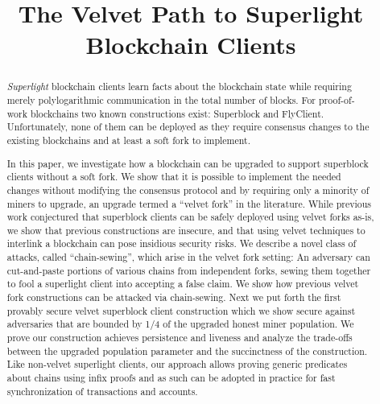\documentclass[sigconf, anonymous]{acmart}
\theoremstyle{plain}
\theoremstyle{definition}
\begin{document}
\title{%
The Velvet Path to Superlight Blockchain Clients
} %

\begin{abstract}
{\em Superlight} blockchain clients
learn facts about the blockchain state
while requiring merely polylogarithmic communication in the total 
number of blocks. 
%
For proof-of-work blockchains %
two known constructions exist: Superblock and FlyClient. 
%
Unfortunately, none of them can be deployed as they require consensus changes to the existing blockchains and at least a soft fork to implement.

In this paper, we %
investigate how a blockchain can be upgraded to support superblock clients without a soft fork. We show that it is possible to implement the needed changes without modifying the consensus protocol and by requiring only a minority of miners to upgrade, an upgrade termed a ``velvet fork'' in the literature. While previous work conjectured that superblock clients can be safely deployed using velvet forks as-is, we show that previous constructions are insecure, and that using velvet techniques to interlink a blockchain can pose insidious security risks. We describe a novel class of attacks, called  ``chain-sewing'', which arise in the velvet fork setting: An adversary can cut-and-paste portions of various chains from independent forks, sewing them together to 
fool a superlight client into accepting a false claim.
We show how previous velvet fork constructions can be attacked via chain-sewing. 
%
Next we put forth the first provably secure velvet superblock client construction which we show  secure against adversaries that are bounded by 1/4 of the upgraded honest miner population. We prove our construction achieves persistence and liveness and analyze the trade-offs between the upgraded population parameter and the succinctness of the construction. Like non-velvet superlight clients, our approach allows proving generic predicates about chains using infix proofs and as such can be adopted in practice for fast synchronization of transactions and accounts.
\end{abstract}
\end{document}
